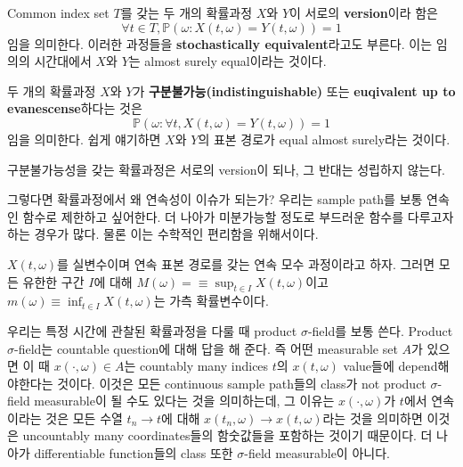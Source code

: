 \documentclass[b5paper,]{scrbook}
\theoremstyle{plain}
\theoremstyle{definition}
\numberwithin{equation}{section}
\let\BeginKnitrBlock\begin \let\EndKnitrBlock\end
\begin{document}
\BeginKnitrBlock{definition}[확률과정의 version]
\protect\hypertarget{def:unnamed-chunk-92}{}{\label{def:unnamed-chunk-92}
{} }Common index set \(T\)를 갖는 두
개의 확률과정 \(X\)와 \(Y\)이 서로의 \textbf{version}이라 함은
\[\forall t \in T, \mathbb{P}(\omega: X(t,\omega)=Y(t,\omega))=1\] 임을
의미한다. 이러한 과정들을 \textbf{stochastically equivalent}라고도
부른다. 이는 임의의 시간대에서 \(X\)와 \(Y\)는 almost surely equal이라는
것이다.
\EndKnitrBlock{definition}

\BeginKnitrBlock{definition}[확률과정의 구분불가능성]
\protect\hypertarget{def:unnamed-chunk-93}{}{\label{def:unnamed-chunk-93}
{} }두 개의 확률과정 \(X\)와
\(Y\)가 \textbf{구분불가능(indistinguishable)} 또는 \textbf{euqivalent
up to evanescense}하다는 것은
\[\mathbb{P}(\omega: \forall t, X(t,\omega)=Y(t,\omega))=1\] 임을
의미한다. 쉽게 얘기하면 \(X\)와 \(Y\)의 표본 경로가 equal almost
surely라는 것이다.
\EndKnitrBlock{definition}

구분불가능성을 갖는 확률과정은 서로의 version이 되나, 그 반대는 성립하지
않는다.

그렇다면 확률과정에서 왜 연속성이 이슈가 되는가? 우리는 sample path를
보통 연속인 함수로 제한하고 싶어한다. 더 나아가 미분가능할 정도로
부드러운 함수를 다루고자 하는 경우가 많다. 물론 이는 수학적인 편리함을
위해서이다.

\BeginKnitrBlock{proposition}
\protect\hypertarget{prp:unnamed-chunk-94}{}{\label{prp:unnamed-chunk-94}
}\(X(t,\omega)\)를 실변수이며 연속 표본 경로를 갖는 연속 모수 과정이라고
하자. 그러면 모든 유한한 구간 \(I\)에 대해
\(M(\omega)=\equiv \sup_{t\in I}X(t,\omega)\)이고
\(m(\omega)\equiv \inf_{t\in I}X(t,\omega)\)는 가측 확률변수이다.
\EndKnitrBlock{proposition}

우리는 특정 시간에 관찰된 확률과정을 다룰 때 product \(\sigma\)-field를
보통 쓴다. Product \(\sigma\)-field는 countable question에 대해 답을 해
준다. 즉 어떤 measurable set \(A\)가 있으면 이 때
\(x(\cdot, \omega)\in A\)는 countably many indices \(t\)의
\(x(t,\omega)\) value들에 depend해야한다는 것이다. 이것은 모든
continuous sample path들의 class가 not product \(\sigma\)-field
measurable이 될 수도 있다는 것을 의미하는데, 그 이유는
\(x(\cdot, \omega)\)가 \(t\)에서 연속이라는 것은 모든 수열
\(t_{n}\rightarrow t\)에 대해
\(x(t_{n},\omega)\rightarrow x(t,\omega)\)라는 것을 의미하면 이것은
uncountably many coordinates들의 함숫값들을 포함하는 것이기 때문이다. 더
나아가 differentiable function들의 class 또한 \(\sigma\)-field
measurable이 아니다.
\end{document}
